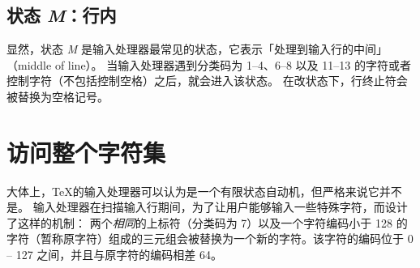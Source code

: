 \documentclass{book}
\begin{document}
\subsection{状态 {\itshape M}：行内}

显然，状态 {\itshape M} 是输入处理器最常见的状态，它表示「处理到输入行的中间」（middle of line）。
当输入处理器遇到分类码为 1--4、6--8 以及 11--13 的字符或者控制字符（不包括控制空格）之后，就会进入该状态。
在改状态下，行终止符会被替换为空格记号。

%

\begin{quotation}
  \figmouth
\end{quotation}

\section{访问整个字符集}
\label{hathat}

大体上，\TeX 的输入处理器可以认为是一个有限状态自动机，但严格来说它并不是。
输入处理器在扫描输入行期间，为了让用户能够输入一些特殊字符，而设计了这样的机制：
两个{\slshape 相同}的上标符（分类码为 7）以及一个字符编码小于 128 的字符（暂称原字符）组成的三元组会被替换为一个新的字符。该字符的编码位于 0 -- 127 之间，并且与原字符的编码相差 64。
\end{document}
